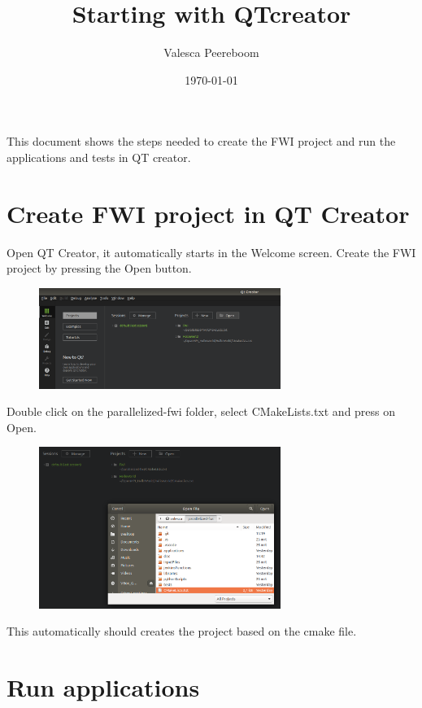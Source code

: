 \documentclass[10pt]{article}
\title{Starting with QTcreator}
\author{Valesca Peereboom}
\date{\today}
\begin{document}
\maketitle
\noindent This document shows the steps needed to create the FWI project and run the applications and tests in QT creator.

\section{Create FWI project in QT Creator}
Open QT Creator, it automatically starts in the Welcome screen. Create the FWI project by pressing the Open button.
\begin{figure}[h!]
\includegraphics[width = 0.7\textwidth]{DocumentationQT_OpenProject}
\end{figure}

Double click on the parallelized-fwi folder, select CMakeLists.txt and press on Open.
\begin{figure}[h!]
\includegraphics[width = 0.7\textwidth]{DocumentationQT_OpenProject3}
\end{figure}


This automatically should creates the project based on the cmake file.

\section{Run applications}
\end{document}
